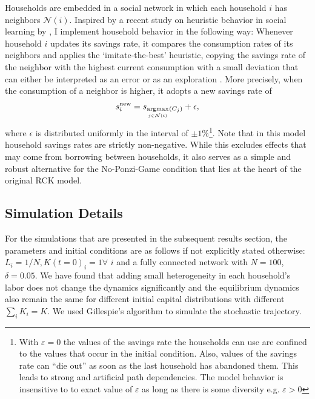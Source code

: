 Households are embedded in a social network in which each household $i$ has neighbors $\mathcal{N}(i)$. Inspired by a recent study on heuristic behavior in social learning by \cite{Barkoczi2016}, I implement household behavior in the following way: Whenever household $i$ updates its savings rate, it compares the consumption rates of its neighbors and applies the `imitate-the-best' heuristic, copying the savings rate of the neighbor with the highest current consumption with a small deviation that can either be interpreted as an error or as an exploration \citep{Mehlhorn2015}. More precisely, when the consumption of a neighbor is higher, it adopts a new savings rate of
\begin{equation} 
	s^\mathrm{new}_i = s_{\underset{j\in \mathcal{N}(i)}{\operatorname*{argmax}}_{} (C_j)} + \epsilon,
\end{equation}
where $\epsilon$ is distributed uniformly in the interval of $\pm 1\%$\footnote{With $\varepsilon=0$ the values of the savings rate the households can use are confined to the values that occur in the initial condition. Also, values of the savings rate can ``die out'' as soon as the last household has abandoned them. This leads to strong and artificial path dependencies. The model behavior is insensitive to to exact value of $\varepsilon$ as long as there is some diversity e.g. $\varepsilon>0$}.
Note that in this model household savings rates are strictly non-negative. While this excludes effects that may come from borrowing between households, it  also serves as a simple and robust alternative for the No-Ponzi-Game condition that lies at the heart of the original RCK model. 

\subsection{Simulation Details}

For the simulations that are presented in the subsequent results section, the parameters and initial conditions are as follows if not explicitly stated otherwise:
$L_i = 1/N, K(t=0)_i \!= \!1 \forall\,\, i$ and a fully connected network with $N=100$, $\delta=0.05$. We have found that adding small heterogeneity in each household's labor does not change the dynamics significantly and the equilibrium dynamics also remain the same for different initial capital distributions with different $\sum_i K_i = K$. We used Gillespie's algorithm \citep{Gillespie1977} to simulate the stochastic trajectory.

